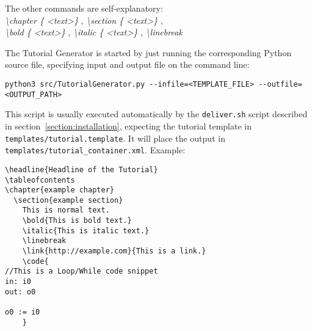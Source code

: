 The other commands are self-explanatory:\\
\textit{\textbackslash chapter \{ \textless text\textgreater\space \} },
\textit{\textbackslash section \{ \textless text\textgreater\space \} },\\
\textit{\textbackslash bold \{ \textless text\textgreater\space \} },
\textit{\textbackslash italic \{ \textless text\textgreater\space \} },
\textit{\textbackslash linebreak}

The Tutorial Generator is started by just running the corresponding Python
source file, specifying input and output file on the command line:
\begin{verbatim} 
python3 src/TutorialGenerator.py --infile=<TEMPLATE_FILE> --outfile=<OUTPUT_PATH>
\end{verbatim}
This script is usually executed automatically by the \verb|deliver.sh| script
described in section~\ref{section:installation}, expecting the tutorial template in
\verb|templates/tutorial.template|. It will place the output in 
\verb|templates/tutorial_container.xml|.
Example:
\lstset{basicstyle=\footnotesize}
\begin{lstlisting}[frame=single]
\headline{Headline of the Tutorial}
\tableofcontents
\chapter{example chapter}
  \section{example section}
    This is normal text.
    \bold{This is bold text.}
    \italic{This is italic text.}
    \linebreak
    \link{http://example.com}{This is a link.}
    \code{
//This is a Loop/While code snippet
in: i0
out: o0

o0 := i0
    }
\end{lstlisting}
